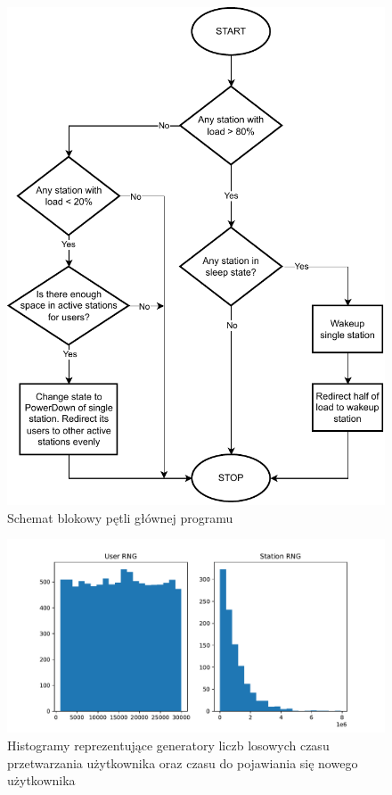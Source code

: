 \begin{figure}
\center
\includegraphics[scale=0.75]{img/power_up_down_logic.pdf} 
\caption{Schemat blokowy pętli głównej programu}
\label{power_up_down}
\end{figure}

\begin{figure}[h]
\center
\includegraphics[scale=0.65]{img/rng.pdf} 
\caption{Histogramy reprezentujące generatory liczb losowych czasu przetwarzania użytkownika oraz czasu do pojawiania się nowego użytkownika}
\label{rng_hist}
\end{figure}